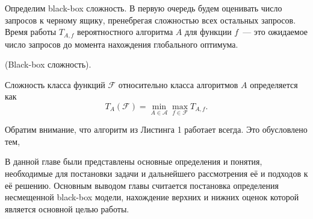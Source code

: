 Определим black-box сложность. В первую очередь будем оценивать число запросов к черному ящику, пренебрегая сложностью всех остальных запросов. Время работы $T_{A,f}$ вероятностного алгоритма $A$ для 
функции $f$~--- это ожидаемое число запросов до момента нахождения глобального оптимума.

\begin{definition}
(Black-box сложность). 

Сложность класса функций $\mathcal{F}$ относительно класса алгоритмов $A$ определяется как
$$T_{A}(\mathcal{F}) = \min_{A \in \mathcal{A}} \max_{f \in \mathcal{F}} T_{A, f}.$$
\end{definition}

Обратим внимание, что алгоритм из Листинга 1 работает всегда. Это обусловлено тем, 

\chapterconclusion
В данной главе были представлены основные определения и понятия, необходимые для постановки задачи и дальнейшего рассмотрения её и подходов к её решению. Основным выводом главы считается постановка 
определения несмещенной black-box модели, нахождение верхних и нижних оценок которой является основной целью работы.   
